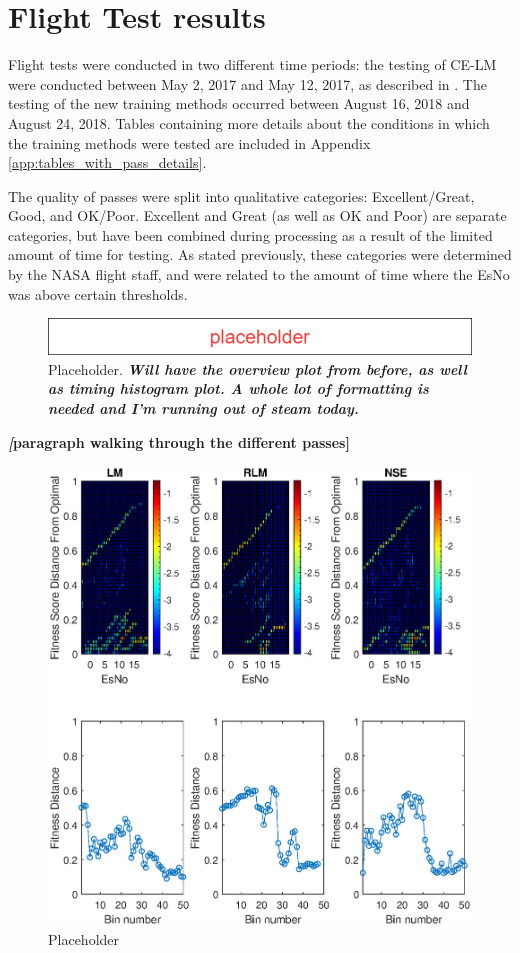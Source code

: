 \section{Flight Test results}
\par Flight tests were conducted in two different time periods: the testing of CE-LM were conducted between May 2, 2017 and May 12, 2017, as described in \cite{tim_implementation_paper}. The testing of the new training methods occurred between August 16, 2018 and August 24, 2018. Tables containing more details about the conditions in which the training methods were tested are included in Appendix \ref{app:tables_with_pass_details}. 
\par The quality of passes were split into qualitative categories: Excellent/Great, Good, and OK/Poor. Excellent and Great (as well as OK and Poor) are separate categories, but have been combined during processing as a result of the limited amount of time for testing. As stated previously, these categories were determined by the NASA flight staff, and were related to the amount of time where the EsNo was above certain thresholds. 
\begin{figure}[ht]
\centering
\includegraphics[scale=0.5]{figures/Placeholder.png}
\caption{Placeholder. \textbf{\textit{Will have the overview plot from before, as well as timing histogram plot. A whole lot of formatting is needed and I'm running out of steam today.}}}
\end{figure}
\par \textbf{\textit[paragraph walking through the different passes]}
\begin{figure}[ht]
\centering
\includegraphics[width=\textwidth]{figures/flight_results/Coop_great_overview.eps}
\caption{Placeholder}
\end{figure}
